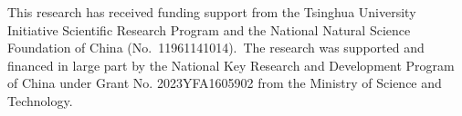 \documentclass[a4paper,11pt]{article}
\begin{document}







\acknowledgments

This research has received funding support from the Tsinghua University Initiative Scientific Research Program and the National Natural Science Foundation of China (No.\ 11961141014).\ The research was supported and financed in large part by the National Key Research and Development Program of China under Grant No. 2023YFA1605902 from the Ministry of Science and Technology.




\end{document}
